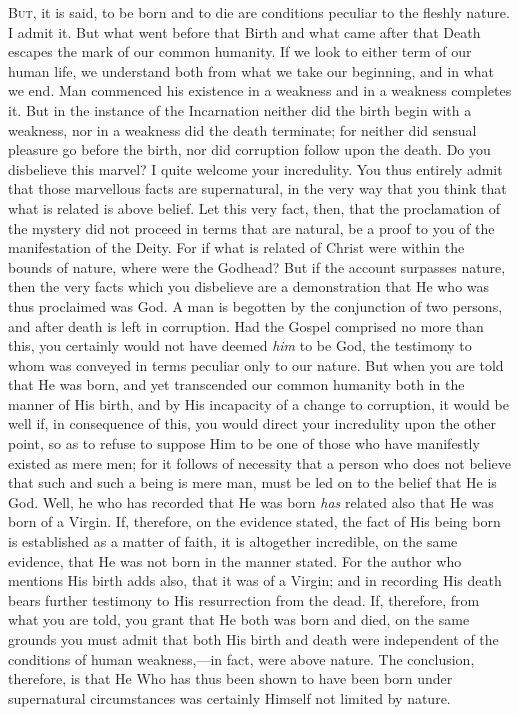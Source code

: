 \textsc{But}, it is said, to be born and to die are conditions peculiar to the fleshly nature. I admit it. But what went before that Birth and what came after that Death escapes the mark of our common humanity. If we look to either term of our human life, we understand both from what we take our beginning, and in what we end. Man commenced his existence in a weakness and in a weakness completes it. But in the instance of the Incarnation neither did the birth begin with a weakness, nor in a weakness did the death terminate; for neither did sensual pleasure go before the birth, nor did corruption follow upon the death. Do you disbelieve this marvel? I quite welcome your incredulity. You thus entirely admit that those marvellous facts are supernatural, in the very way that you think that what is related is above belief. Let this very fact, then, that the proclamation of the mystery did not proceed in terms that are natural, be a proof to you of the manifestation of the Deity. For if what is related of Christ were within the bounds of nature, where were the Godhead? But if the account surpasses nature, then the very facts which you disbelieve are a demonstration that He who was thus proclaimed was God. A man is begotten by the conjunction of two persons, and after death is left in corruption. Had the Gospel comprised no more than this, you certainly would not have deemed \emph{him} to be God, the testimony to whom was conveyed in terms peculiar only to our nature. But when you are told that He was born, and yet transcended our common humanity both in the manner of His birth, and by His incapacity of a change to corruption, it would be well if, in consequence of this, you would direct your incredulity upon the other point, so as to refuse to suppose Him to be one of those who have manifestly existed as mere men; for it follows of necessity that a person who does not believe that such and such a being is mere man, must be led on to the belief that He is God. Well, he who has recorded that He was born \emph{has} related also that He was born of a Virgin. If, therefore, on the evidence stated, the fact of His being born is established as a matter of faith, it is altogether incredible, on the same evidence, that He was not born in the manner stated. For the author who mentions His birth adds also, that it was of a Virgin; and in recording His death bears further testimony to His resurrection from the dead. If, therefore, from what you are told, you grant that He both was born and died, on the same grounds you must admit that both His birth and death were independent of the conditions of human weakness,—in fact, were above nature. The conclusion, therefore, is that He Who has thus been shown to have been born under supernatural circumstances was certainly Himself not limited by nature.

